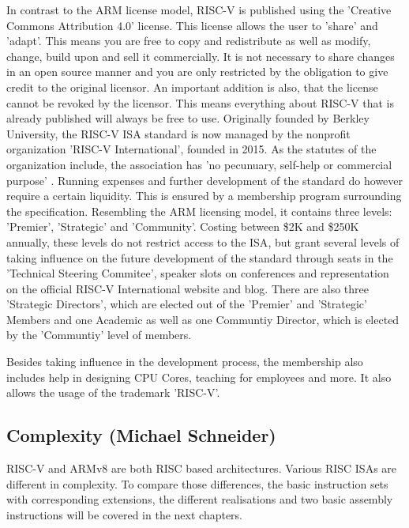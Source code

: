 \documentclass[conference]{IEEEtran}
\begin{document}
	In contrast to the ARM license model, RISC-V is published using the 'Creative Commons Attribution 4.0' license. \cite{Waterman2017}\cite{Waterman2017a} This license allows the user to 'share' and 'adapt'. This means you are free to copy and redistribute as well as modify, change, build upon and sell it commercially. It is not necessary to share changes in an open source manner and you are only restricted by the obligation to give credit to the original licensor. \cite{CC} An important addition is also, that the license cannot be revoked by the licensor. This means everything about RISC-V that is already published will always be free to use.
	Originally founded by Berkley University, the RISC-V \gls{ISA} standard is now managed by the nonprofit organization 'RISC-V International', founded in 2015. \cite{RVIAbout} As the statutes of the organization include, the association has 'no pecunuary, self-help or commercial purpose' \cite{RVIArt}. Running expenses and further development of the standard do however require a certain liquidity. This is ensured by a membership program surrounding the specification. \cite{RVIMem} Resembling the ARM licensing model, it contains three levels: 'Premier', 'Strategic' and 'Community'. Costing between \$2K and \$250K annually, these levels do not restrict access to the \gls{ISA}, but grant several levels of taking influence on the future development of the standard through seats in the 'Technical Steering Commitee', speaker slots on conferences and representation on the official RISC-V International website and blog. There are also three 'Strategic Directors', which are elected out of the 'Premier' and 'Strategic' Members and one Academic as well as one Communtiy Director, which is elected by the 'Communtiy' level of members. \cite{RVIAss}

	Besides taking influence in the development process, the membership also includes help in designing \gls{CPU} Cores, teaching for employees and more. It also allows the usage of the trademark 'RISC-V'.

	\subsection{Complexity (Michael Schneider)}
	RISC-V and ARMv8 are both \gls{RISC} based architectures. %
	Various \gls{RISC} \glspl{ISA} are different in complexity. To compare those differences, the basic instruction sets with corresponding extensions, the different realisations and two basic assembly instructions will be covered in the next chapters.
	
\end{document}
